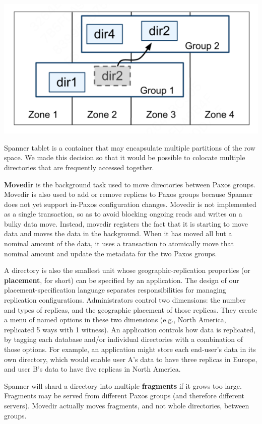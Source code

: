 \documentclass[11pt]{article}
\begin{document}
\begin{center}
\includegraphics[width=.5\textwidth]{../../images/papers/60.png}
\label{3}
\end{center}

Spanner tablet is a container that may encapsulate multiple partitions of the row space. We made this
decision so that it would be possible to colocate multiple directories that are frequently accessed
together.

\textbf{Movedir} is the background task used to move directories between Paxos groups. Movedir is also used to
add or remove replicas to Paxos groups because Spanner does not yet support in-Paxos configuration
changes. Movedir is not implemented as a single transaction, so as to avoid blocking ongoing reads and
writes on a bulky data move. Instead, movedir registers the fact that it is starting to move data and
moves the data in the background. When it has moved all but a nominal amount of the data, it uses a
transaction to atomically move that nominal amount and update the metadata for the two Paxos groups.

A directory is also the smallest unit whose geographic-replication properties (or \textbf{placement}, for
short) can be specified by an application. The design of our placement-specification language
separates responsibilities for managing replication configurations. Administrators control two
dimensions: the number and types of replicas, and the geographic placement of those replicas. They
create a menu of named options in these two dimensions (e.g., North America, replicated 5 ways with 1
witness). An application controls how data is replicated, by tagging each database and/or individual
directories with a combination of those options. For example, an application might store each
end-user’s data in its own directory, which would enable user A’s data to have three replicas in
Europe, and user B’s data to have five replicas in North America.

Spanner will shard a directory into multiple \textbf{fragments} if it grows too large. Fragments may be served
from different Paxos groups (and therefore different servers). Movedir actually moves fragments, and
not whole directories, between groups.
\end{document}
